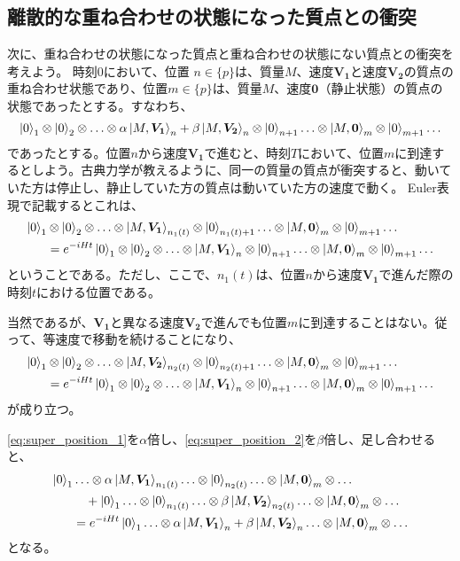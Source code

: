 \subsection{離散的な重ね合わせの状態になった質点との衝突}
次に、重ね合わせの状態になった質点と重ね合わせの状態にない質点との衝突を考えよう。
時刻$0$において、位置 $n \in \{p\}$は、質量$M$、速度$\bm{V_1}$と速度$\bm{V_2}$の質点の重ね合わせ状態であり、位置$m \in \{p\}$は、質量$M$、速度$\bm{0}$（静止状態）の質点の状態であったとする。すなわち、
\begin{equation}
    \ket{0}_1 \otimes \ket{0}_2 \otimes \ldots \otimes \alpha \ket{M,\bm{V_1}}_n + \beta \ket{M,\bm{V_2}}_n \otimes \ket{0}_{n+1} \ldots \otimes \ket{M,\bm{0}}_m \otimes \ket{0}_{m+1} \ldots
\end{equation}
であったとする。位置$n$から速度$\bm{V_1}$で進むと、時刻$T$において、位置$m$に到達するとしよう。古典力学が教えるように、同一の質量の質点が衝突すると、動いていた方は停止し、静止していた方の質点は動いていた方の速度で動く。
Euler表現で記載するとこれは、
\begin{align}
    \label{eq:super_position_1}
    \ket{0}_1 & \otimes \ket{0}_2 \otimes \ldots \otimes \ket{M,\bm{V_1}}_{n_1(t)} \otimes \ket{0}_{n_1(t)+1} \ldots \otimes \ket{M,\bm{0}}_m \otimes \ket{0}_{m+1} \ldots \\
    &=e^{-iHt}\ket{0}_1 \otimes \ket{0}_2 \otimes \ldots \otimes \ket{M,\bm{V_1}}_n \otimes \ket{0}_{n+1} \ldots \otimes \ket{M,\bm{0}}_m \otimes \ket{0}_{m+1} \ldots \nonumber
\end{align}
ということである。ただし、ここで、$n_1(t)$は、位置$n$から速度$\bm{V_1}$で進んだ際の時刻$t$における位置である。\par
当然であるが、$\bm{V_1}$と異なる速度$\bm{V_2}$で進んでも位置$m$に到達することはない。従って、等速度で移動を続けることになり、
\begin{align}
    \label{eq:super_position_2}
    \ket{0}_1 & \otimes \ket{0}_2 \otimes \ldots \otimes \ket{M,\bm{V_2}}_{n_2(t)} \otimes \ket{0}_{n_2(t)+1} \ldots \otimes \ket{M,\bm{0}}_m \otimes \ket{0}_{m+1} \ldots \\
    &=e^{-iHt}\ket{0}_1 \otimes \ket{0}_2 \otimes \ldots \otimes \ket{M,\bm{V_1}}_n \otimes \ket{0}_{n+1} \ldots \otimes \ket{M,\bm{0}}_m \otimes \ket{0}_{m+1} \ldots \nonumber
\end{align}
が成り立つ。\par
\eqref{eq:super_position_1}を$\alpha$倍し、\eqref{eq:super_position_2}を$\beta$倍し、足し合わせると、
\begin{align}
    \ket{0}_1 & \ldots \otimes \alpha \ket{M,\bm{V_1}}_{n_1(t)} \ldots \otimes \ket{0}_{n_2(t)}  \ldots \otimes \ket{M,\bm{0}}_m \otimes\ldots \\
    & \quad + \ket{0}_1 \ldots \otimes \ket{0}_{n_1(t)} \ldots \otimes \beta \ket{M,\bm{V_2}}_{n_2(t)}  \ldots \otimes \ket{M,\bm{0}}_m \otimes \ldots \nonumber \\
    &=e^{-iHt}\ket{0}_1 \ldots \otimes \alpha \ket{M,\bm{V_1}}_n + \beta \ket{M,\bm{V_2}}_n \ldots \otimes \ket{M,\bm{0}}_m \otimes \ldots \nonumber
\end{align}
となる。
